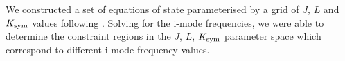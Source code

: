 \documentclass[fleqn,usenatbib]{mnras}
\begin{document}
\hspace{\parindent}We constructed a set of equations of state parameterised by a grid of $J$, $L$ and $K_{\rm sym}$ values following \citet{newton2020nuclear}. Solving for the i-mode frequencies, we were able to determine the constraint regions in the $J$, $L$, $K_{\rm sym}$ parameter space which correspond to different i-mode frequency values.



\end{document}
